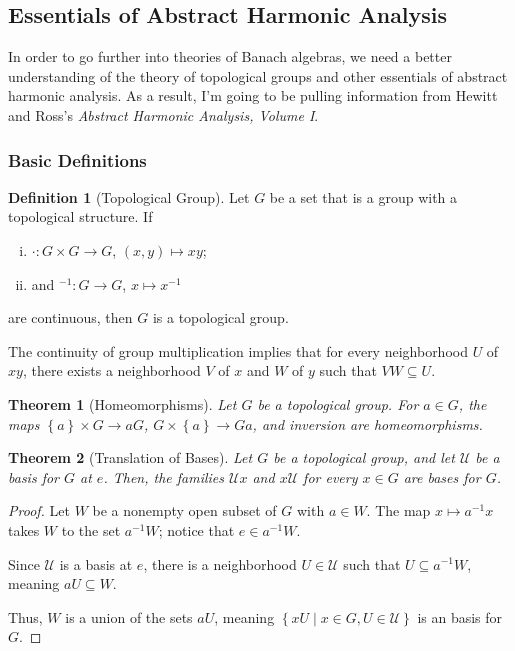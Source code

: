 \documentclass[12pt]{extarticle}
\newcommand{\set}[1]{\left\{#1\right\}}
\theoremstyle{plain}
\newtheorem*{theorem}{Theorem}
\theoremstyle{definition}
\newtheorem*{definition}{Definition}
\theoremstyle{note}
\renewcommand{\newline}{\hfill\break}
\begin{document}
\subsection{Essentials of Abstract Harmonic Analysis}%
In order to go further into theories of Banach algebras, we need a better understanding of the theory of topological groups and other essentials of abstract harmonic analysis. As a result, I'm going to be pulling information from Hewitt and Ross's \textit{Abstract Harmonic Analysis, Volume I}.
\subsubsection{Basic Definitions}%
\begin{definition}[Topological Group]
Let $G$ be a set that is a group with a topological structure. If
\begin{enumerate}[(i)]
  \item $\cdot: G\times G \rightarrow G$, $(x,y) \mapsto xy$;
  \item and $^{-1}: G\rightarrow G$, $x\mapsto x^{-1}$
\end{enumerate}
are continuous, then $G$ is a topological group.
\end{definition}
The continuity of group multiplication implies that for every neighborhood $U$ of $xy$, there exists a neighborhood $V$ of $x$ and $W$ of $y$ such that $VW \subseteq U$.
\begin{theorem}[Homeomorphisms]
  Let $G$ be a topological group. For $a\in G$, the maps $\set{a}\times G \rightarrow aG$, $G\times \set{a}\rightarrow Ga$, and inversion are homeomorphisms.
\end{theorem}
\begin{theorem}[Translation of Bases]
  Let $G$ be a topological group, and let $\mathcal{U}$ be a basis for $G$ at $e$. Then, the families $\mathcal{U}x$ and $x\mathcal{U}$ for every $x\in G$ are bases for $G$.
\end{theorem}
\begin{proof}
  Let $W$ be a nonempty open subset of $G$ with $a\in W$. The map $x \mapsto a^{-1}x$ takes $W$ to the set $a^{-1}W$; notice that $e\in a^{-1}W$.\newline

  Since $\mathcal{U}$ is a basis at $e$, there is a neighborhood $U\in \mathcal{U}$ such that $U\subseteq a^{-1}W$, meaning $aU\subseteq W$.\newline

  Thus, $W$ is a union of the sets $aU$, meaning $\set{xU\mid x\in G,U\in \mathcal{U}}$ is an basis for $G$.
\end{proof}
\end{document}
